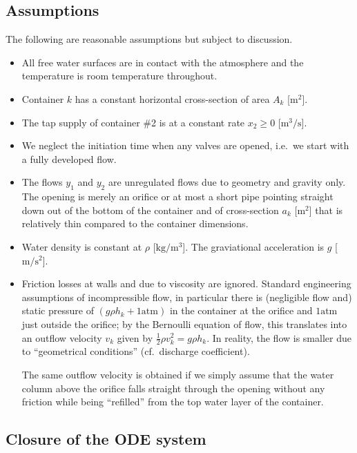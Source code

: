\documentclass[12pt,a4paper]{article}
\begin{document}
	\subsection*{Assumptions}
	
	The following are reasonable assumptions
	but subject to discussion.
	\begin{itemize}
	\item
		All free water surfaces are in contact with the atmosphere
		and the temperature is room temperature throughout.
	\item
		Container $k$ has a constant horizontal cross-section 
		of area $A_k$ [$\text{m}^2$].
	\item
		The tap supply of container \#2
		is at a constant rate $x_2 \geq 0$ [$\mathrm{m^3 / s}$].
	\item
		We neglect the initiation time
		when any valves are opened,
		i.e.~we start with a fully developed flow.
	\item
		The flows $y_1$ and $y_2$ are unregulated flows
		due to geometry and gravity only.
		The opening is merely an orifice or at most 
		a short pipe pointing straight down out of 
		the bottom of the container
		and
		of cross-section $a_k$ [$\mathrm{m^2}$]
		that is relatively thin
		compared to the container dimensions.
	\item
		Water density is constant at $\rho$ [$\mathrm{kg/m^3}$].
		The graviational acceleration is $g$ [$\mathrm{m/s^2}$].
		
	\item
		Friction losses at walls and due to viscosity are ignored.
		Standard engineering assumptions of incompressible flow,
		in particular
		there is 
		(negligible flow and)
		static pressure of $(g \rho h_k + \mathrm{1atm})$ in the container 
		at the orifice
		and
		$\mathrm{1atm}$
		just outside the orifice;
		by the Bernoulli equation of flow, this translates
		into an outflow velocity $v_k$
		given by
		$\frac12 \rho v_k^2 = g \rho h_k$.
		In reality, the flow is smaller due to ``geometrical conditions''
		(cf.~discharge coefficient).
		
		The same outflow velocity is obtained if we simply
		assume that
		the water column above the orifice 
		falls straight through the opening without any friction
		while being ``refilled'' 
		from the top water layer of the container.
	\end{itemize}
	
	\subsection*{Closure of the ODE system}
	
\end{document}
